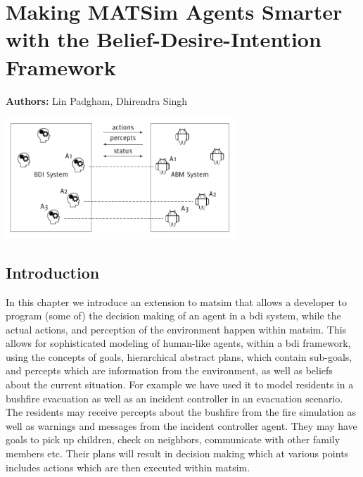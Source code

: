 \chapter{Making MATSim Agents Smarter with the Belief-Desire-Intention Framework}
\label{ch:bdi}

\hfill \textbf{Authors:} Lin Padgham, Dhirendra Singh

\begin{center} \includegraphics[width=0.65\textwidth, angle=0]{extending/figures/bdi/title.png} \end{center}

\section{Introduction}
\label{sec:bdi-intro}
In this chapter we introduce an extension to \gls{matsim} that allows a
developer to program (some of) the decision making of an agent in a \gls{bdi} system, while the actual actions, and
perception of the environment happen within \gls{matsim}. This allows for
sophisticated modeling of human-like agents, within a \gls{bdi}
framework, using the concepts of goals, hierarchical abstract plans,
which contain sub-goals, and percepts which are information from the
environment, as well as beliefs about the current situation. For
example we have used it to model residents in a 
bushfire evacuation as well as an incident controller in an evacuation
scenario. The residents may receive percepts about the bushfire from
the fire simulation as well as warnings and messages from the incident
controller agent. They may
have goals to pick up children, check on neighbors, communicate with
other family members etc. Their plans will result in
decision making which at various points includes actions which are then
executed within \gls{matsim}.

